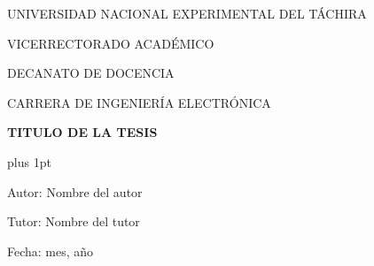 \begin{center}
	\begin{spacing}{1}
		UNIVERSIDAD NACIONAL EXPERIMENTAL DEL TÁCHIRA
		
		VICERRECTORADO ACADÉMICO
		
		DECANATO DE DOCENCIA
		
		CARRERA DE INGENIERÍA ELECTRÓNICA
	
		\vspace{30pt}

		{\large \textbf{TITULO DE LA TESIS}\par}
	
	\end{spacing}
\end{center}

\vspace{20pt}

\begin{flushright}
	\begin{spacing}{1}
		\parskip=0pt plus 1pt

		Autor: Nombre del autor

		Tutor: Nombre del tutor

		Fecha: mes, año
		
	\end{spacing}	
\end{flushright}

\vspace{10pt}

\begin{abstract}
	\blindtext
	\blindtext
	\blindtext
\end{abstract}

